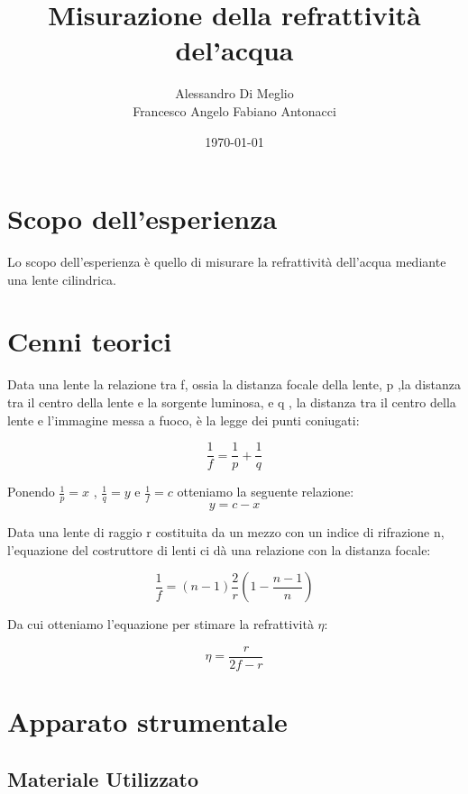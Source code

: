 \documentclass{article}
\title{Misurazione della refrattività del'acqua}
\author{Alessandro Di Meglio \\ Francesco Angelo Fabiano Antonacci}
\date{\today}
\begin{document}
\maketitle
\section{Scopo dell'esperienza}

Lo scopo dell'esperienza è quello di misurare la refrattività  dell'acqua mediante una lente cilindrica.

\section{Cenni teorici}

Data una lente la relazione tra f, ossia la distanza focale della lente, p ,la distanza tra il centro della lente e la sorgente luminosa, e q , la distanza tra il centro della lente e l'immagine messa a fuoco, è la legge dei punti coniugati:

\begin{equation}
\frac{1}{f}=\frac{1}{p}+\frac{1}{q}
\label{pucon}
\end{equation}

Ponendo $\frac{1}{p}=x$ ,  $\frac{1}{q}=y$ e $\frac{1}{f}=c$ otteniamo la seguente relazione:
\begin{equation}
y=c-x
\label{:)}
\end{equation}
 


Data una lente di raggio r costituita da un mezzo con un indice di rifrazione n, l'equazione del costruttore di lenti ci dà una relazione con la distanza focale:

\begin{equation}
\frac{1}{f}=(n-1)\frac{2}{r}(1-\frac{n-1}{n})
\label{lme}
\end{equation}

Da cui otteniamo l'equazione per stimare la refrattività $\eta$:

\begin{equation}
\eta=\frac{r}{2f-r}
\label{refr}
\end{equation}


\section{Apparato strumentale}

\subsection{Materiale Utilizzato}
\end{document}
